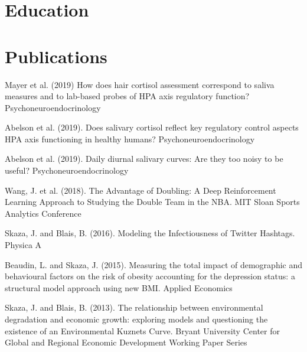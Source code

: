\documentclass[letterpaper]{twentysecondcv} %
\begin{document}
\section{Education}

\begin{twenty} %
\end{twenty}


\section{Publications}

Mayer et al. (2019) How does hair cortisol assessment correspond to saliva measures and to lab-based probes of HPA axis regulatory function? Psychoneuroendocrinology

Abelson et al. (2019). Does salivary cortisol reflect key regulatory control aspects HPA axis functioning in healthy humans? Psychoneuroendocrinology

Abelson et al. (2019). Daily diurnal salivary curves: Are they too noisy to be useful? Psychoneuroendocrinology

Wang, J. et al. (2018). The Advantage of Doubling: A Deep Reinforcement Learning Approach to Studying the Double Team in the NBA. MIT Sloan Sports Analytics Conference
	
Skaza, J. and Blais, B. (2016). Modeling the Infectiousness of Twitter Hashtags. Physica A
	
Beaudin, L. and Skaza, J. (2015). Measuring the total impact of demographic and behavioural factors on the risk of obesity accounting for the depression status: a structural model approach using new BMI. Applied Economics
	
Skaza, J. and Blais, B. (2013). The relationship between environmental degradation and economic growth: exploring models and questioning the existence of an Environmental Kuznets Curve. Bryant University Center for Global and Regional Economic Development Working Paper Series

\end{document}

